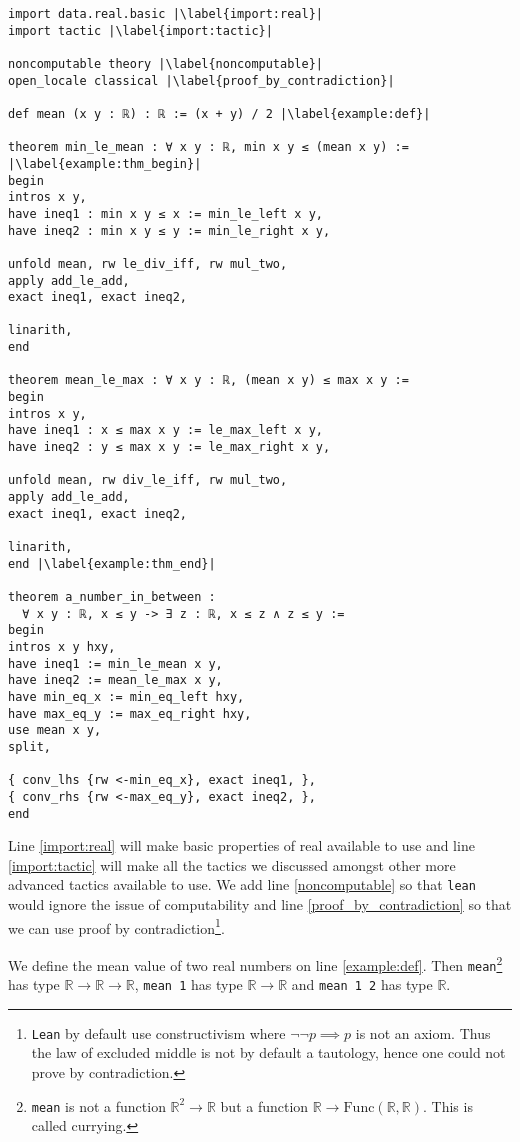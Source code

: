\documentclass{report}
\theoremstyle{definition}
\theoremstyle{plain}
\begin{document}
\begin{verbatim}
import data.real.basic |\label{import:real}|
import tactic |\label{import:tactic}|
  
noncomputable theory |\label{noncomputable}|
open_locale classical |\label{proof_by_contradiction}|  

def mean (x y : ℝ) : ℝ := (x + y) / 2 |\label{example:def}|
  
theorem min_le_mean : ∀ x y : ℝ, min x y ≤ (mean x y) := |\label{example:thm_begin}|
begin
intros x y,
have ineq1 : min x y ≤ x := min_le_left x y,
have ineq2 : min x y ≤ y := min_le_right x y,
    
unfold mean, rw le_div_iff, rw mul_two, 
apply add_le_add, 
exact ineq1, exact ineq2, 
  
linarith,
end
  
theorem mean_le_max : ∀ x y : ℝ, (mean x y) ≤ max x y :=
begin
intros x y,
have ineq1 : x ≤ max x y := le_max_left x y,
have ineq2 : y ≤ max x y := le_max_right x y,
  
unfold mean, rw div_le_iff, rw mul_two,
apply add_le_add,
exact ineq1, exact ineq2,
  
linarith,
end |\label{example:thm_end}|
  
theorem a_number_in_between : 
  ∀ x y : ℝ, x ≤ y -> ∃ z : ℝ, x ≤ z ∧ z ≤ y :=
begin
intros x y hxy,
have ineq1 := min_le_mean x y,
have ineq2 := mean_le_max x y,
have min_eq_x := min_eq_left hxy,
have max_eq_y := max_eq_right hxy,
use mean x y,
split,
  
{ conv_lhs {rw <-min_eq_x}, exact ineq1, },
{ conv_rhs {rw <-max_eq_y}, exact ineq2, },
end

\end{verbatim}

Line \ref{import:real} will make basic properties of real available to use and line \ref{import:tactic} will make all the tactics we discussed amongst other more advanced tactics available to use. We add line \ref{noncomputable} so that {\tt lean} would ignore the issue of computability and line \ref{proof_by_contradiction} so that we can use proof by contradiction\footnote{{\tt Lean} by default use constructivism where $\neg\neg p\implies p$ is not an axiom. Thus the law of excluded middle is not by default a tautology, hence one could not prove by contradiction.}. 

We define the mean value of two real numbers on line \ref{example:def}. Then {\tt mean}\footnote{{\tt mean} is not a function $\mathbb R^2\to\mathbb R$ but a function $\mathbb R\to\mathrm{Func}(\mathbb R,\mathbb R)$. This is called currying.} has type $\mathbb R\to \mathbb R\to \mathbb R$, {\tt mean 1} has type $\mathbb R\to \mathbb R$ and {\tt mean 1 2} has type $\mathbb R$. 
\end{document}
